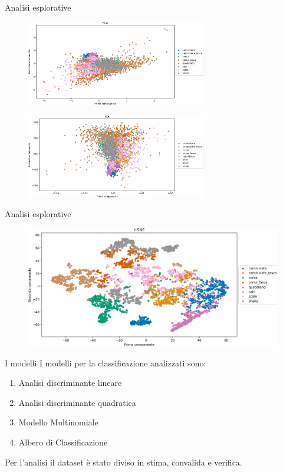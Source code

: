 \documentclass{beamer}
\begin{document}
\begin{frame}{Analisi esplorative}
\begin{figure}[H]
\includegraphics[width=0.7\textwidth]{../figure/PCA.png}
\end{figure}
\begin{figure}[H]
\includegraphics[width=0.7\textwidth]{../figure/ICA.png}
\end{figure}
\end{frame}

\begin{frame}{Analisi esplorative}
\begin{figure}[H]
\includegraphics[width=\textwidth]{../figure/t-SNE.png}
\end{figure}
\end{frame}

\begin{frame}{I modelli}
I modelli per la classificazione analizzati sono: 
\begin{enumerate}
\item Analisi discriminante lineare
\item Analisi discriminante quadratica
\item Modello Multinomiale
\item Albero di Classificazione
\end{enumerate}

Per l'analisi il dataset è stato diviso in stima, convalida e verifica. 
\end{frame}
\end{document}
